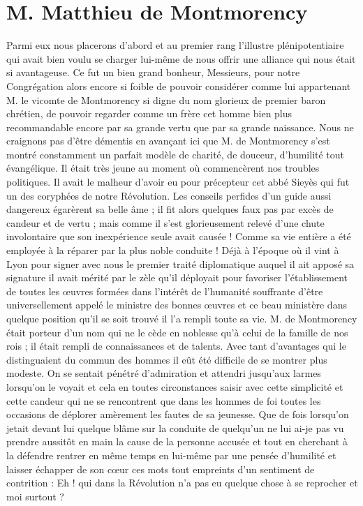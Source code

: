 \section*{M. Matthieu de Montmorency}
Parmi eux nous placerons d'abord et au premier rang l'illustre plénipotentiaire qui avait bien voulu se charger lui-même de nous offrir une alliance qui nous était si avantageuse. Ce fut un bien grand bonheur, Messieurs, pour notre Congrégation alors encore si foible de pouvoir considérer comme lui appartenant M. le vicomte de Montmorency si digne du nom glorieux de premier baron chrétien, de pouvoir regarder comme un frère cet homme bien plus recommandable encore par sa grande vertu que par sa grande naissance. Nous ne craignons pas d'être démentis en avançant ici que M. de Montmorency s'est montré constamment un parfait modèle de charité, de douceur, d'humilité tout évangélique. Il était très jeune au moment
où commencèrent nos troubles politiques. Il avait le malheur d'avoir eu pour précepteur cet abbé Sieyès qui fut un des coryphées de notre Révolution. Les conseils perfides d'un guide aussi dangereux égarèrent sa belle âme ; il fit alors quelques faux pas par excès de candeur et de vertu ; mais comme il s'est glorieusement relevé d'une chute involontaire que son inexpérience seule avait causée ! Comme sa vie entière a été employée à la réparer par la plus noble conduite ! Déjà à l'époque où il vint à Lyon pour signer avec nous le premier traité diplomatique auquel il ait apposé sa signature il avait mérité par le zèle qu'il déployait pour favoriser l'établissement de toutes les œuvres formées dans l'intérêt de l'humanité souffrante d'être universellement appelé le ministre des bonnes œuvres et ce beau ministère dans quelque position qu'il se soit trouvé il l'a rempli toute sa vie. M. de Montmorency était porteur d'un nom qui ne le cède en noblesse qu'à celui de la famille de nos rois ; il était rempli de connaissances et de talents. Avec tant d'avantages qui le distinguaient du commun des hommes il eût été difficile de se montrer plus modeste. On se sentait pénétré d'admiration et attendri jusqu'aux larmes lorsqu'on le voyait et cela en toutes circonstances saisir avec cette simplicité et cette candeur qui ne se rencontrent que dans les hommes de foi toutes les occasions de déplorer amèrement les fautes de sa jeunesse. Que de fois lorsqu'on jetait devant lui quelque blâme sur la conduite de quelqu'un ne lui ai-je pas vu prendre aussitôt en main la cause de la personne accusée et tout en cherchant
à la défendre rentrer en même temps en lui-même par une pensée d'humilité et laisser échapper de son cœur ces mots tout empreints d'un sentiment de contrition : Eh ! qui dans la Révolution n'a pas eu quelque chose à se reprocher et moi surtout ?

